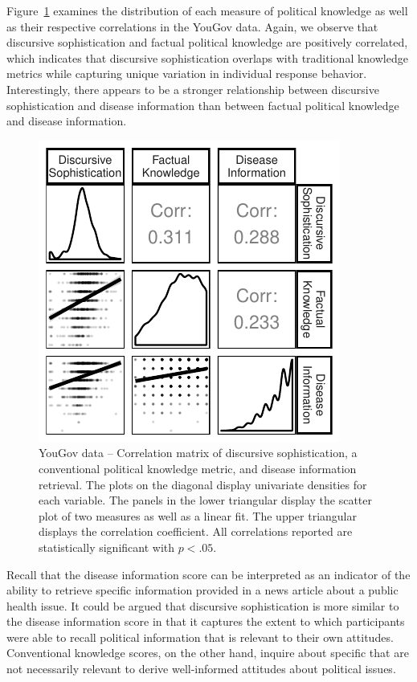 \documentclass[12pt]{article}
\begin{document}
Figure~\ref{fig:yg_corplot} examines the distribution of each measure of political knowledge as well as their respective correlations in the YouGov data. Again, we observe that discursive sophistication and factual political knowledge are positively correlated, which indicates that discursive sophistication overlaps with traditional knowledge metrics while capturing unique variation in individual response behavior. Interestingly, there appears to be a stronger relationship between discursive sophistication and disease information than between factual political knowledge and disease information.

\begin{figure}[h]\centering
\includegraphics{../fig/yg_corplot.pdf}
\caption{YouGov data -- Correlation matrix of discursive sophistication, a conventional political knowledge metric, and disease information retrieval. The plots on the diagonal display univariate densities for each variable. The panels in the lower triangular display the scatter plot of two measures as well as a linear fit. The upper triangular displays the correlation coefficient. All correlations reported are statistically significant with $p<.05$.}\label{fig:yg_corplot}
\end{figure}

Recall that the disease information score can be interpreted as an indicator of the ability to retrieve specific information provided in a news article about a public health issue. It could be argued that discursive sophistication is more similar to the disease information score in that it captures the extent to which participants were able to recall political information that is relevant to their own attitudes. Conventional knowledge scores, on the other hand, inquire about specific that are not necessarily relevant to derive well-informed attitudes about political issues.
\end{document}

